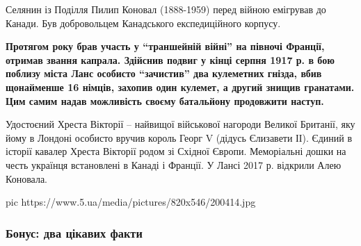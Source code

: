 Селянин із Поділля Пилип Коновал (1888-1959) перед війною емігрував до
Канади. Був добровольцем Канадського експедиційного корпусу.

\begin{leftbar}
	\bfseries
Протягом року брав участь у \enquote{траншейній війні} на півночі Франції,
отримав звання капрала. Здійснив подвиг у кінці серпня 1917 р. в бою
поблизу міста Ланс особисто \enquote{зачистив} два кулеметних гнізда, вбив
щонайменше 16 німців, захопив один кулемет, а другий знищив гранатами.
Цим самим надав можливість своєму батальйону продовжити наступ.
\end{leftbar}

Удостоєний Хреста Вікторії – найвищої військової нагороди Великої
Британії, яку йому в Лондоні особисто вручив король Георг V (дідусь
Єлизавети ІІ). Єдиний в історії кавалер Хреста Вікторії родом зі Східної
Європи. Меморіальні дошки на честь українця встановлені в Канаді і
Франції. У Лансі 2017 р. відкрили Алею Коновала.

\ifcmt
pic https://www.5.ua/media/pictures/820x546/200414.jpg
\fi

\subsubsection{Бонус: два цікавих факти}

